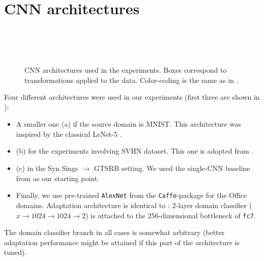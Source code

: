 \section{CNN architectures}
\label{sect:appendix_archs}

\begin{figure*}[t]
  \centering
  \\
  \\
  \\
  \caption{CNN architectures used in the experiments. Boxes correspond to transformations applied to the data. Color-coding is the same as in .}
  \label{fig:exper_archs}
\end{figure*}

Four different architectures were used in our experiments (first three are shown in ):
\begin{itemize}
  \item A smaller one (a) if the source domain is MNIST. This architecture was inspired by the classical LeNet-5 \cite{LeCun98}.
  \item (b) for the experiments involving SVHN dataset. This one is adopted from \cite{Srivastava14}.
  \item (c) in the {\sc Syn Sings} $ \rightarrow $ {\sc GTSRB} setting. We used the single-CNN baseline from \cite{Cirecsan12} as our starting point.
  \item Finally, we use pre-trained \texttt{AlexNet} from the \texttt{Caffe}-package \cite{Jia14} for the {\sc Office} domains. Adaptation architecture is identical to \cite{Tzeng14}: 2-layer domain classifier ($x\rightarrow1024\rightarrow1024\rightarrow2$) is attached to the $ 256 $-dimensional bottleneck of \texttt{fc7}.  
\end{itemize}
The domain classifier branch in all cases is somewhat arbitrary (better adaptation performance might be attained if this part of the architecture is tuned).

